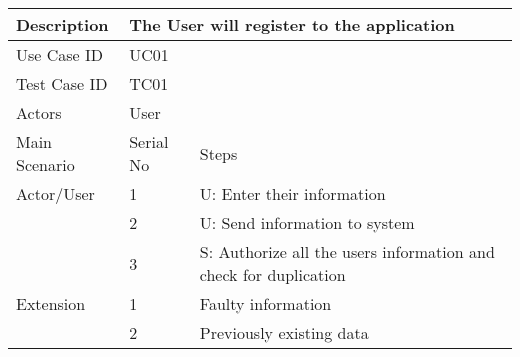 \begin{table}[]
    \centering
    \begin{tabular}{|l|llll|}
        \hline
        Description   & \multicolumn{4}{l|}{The User will register to the application}                                                                                         \\ \hline
        Use Case ID   & \multicolumn{4}{l|}{UC01}                                                                                                                              \\ \hline
        Test Case ID  & \multicolumn{4}{l|}{TC01}                                                                                                                              \\ \hline
        Actors        & \multicolumn{4}{l|}{User}                                                                                                                              \\ \hline
        Main Scenario & \multicolumn{1}{l|}{Serial No}                                 & \multicolumn{3}{l|}{Steps}                                                            \\ \hline
        Actor/User    & \multicolumn{1}{l|}{1}                                         & \multicolumn{3}{l|}{U: Enter their information}                                       \\ \hline
                      & \multicolumn{1}{l|}{2}                                         & \multicolumn{3}{l|}{U: Send information to system}                                    \\ \hline
                      & \multicolumn{1}{l|}{3}                                         & \multicolumn{3}{l|}{S: Authorize all the users information and check for duplication} \\ \hline
        Extension     & \multicolumn{1}{l|}{1}                                         & \multicolumn{3}{l|}{Faulty information}                                               \\ \hline
                      & \multicolumn{1}{l|}{2}                                         & \multicolumn{3}{l|}{Previously existing data}                                         \\ \hline
    \end{tabular}
\end{table}

